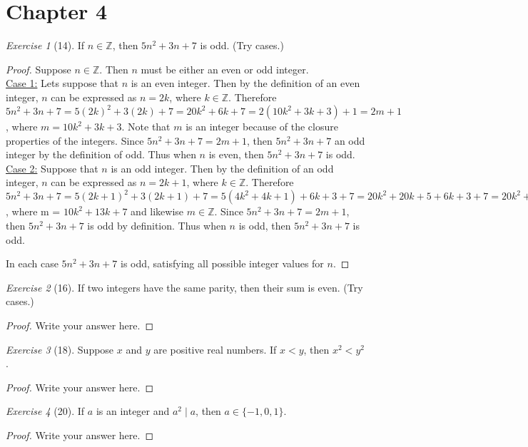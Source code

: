 \documentclass[12pt]{amsart}
\theoremstyle{remark}
\newtheorem*{exercise}{Exercise}%
\def\ZZ{\ensuremath{\mathbb Z}}
\theoremstyle{mycomment}
\begin{document}
\thispagestyle{fancy}
\section*{Chapter 4}
\begin{exercise}[14] If $n\in\ZZ$, then $5n^{2}+3n+7$ is odd. (Try cases.)
\begin{proof}
Suppose $n \in \ZZ$. Then $n$ must be either an even or odd integer. 
\\ \underline{Case 1:} Lets suppose that $n$ is an even integer. Then by the definition of an even integer, $n$ can be expressed as $n = 2k$, where $k \in \ZZ$. Therefore $5n^2 + 3n + 7 = 5(2k)^2 + 3(2k) + 7 = 20k^2 + 6k + 7 =2(10k^2 + 3k + 3) + 1 = 2m + 1$, where $m = 10k^2 + 3k + 3$. Note that $m$ is an integer because of the closure properties of the integers. Since $5n^{2}+3n+7 = 2m + 1$, then $5n^{2}+3n+7$ an odd integer by the definition of odd. Thus when $n$ is even, then $5n^{2}+3n+7$ is odd.
\\ \underline{Case 2:} Suppose that $n$ is an odd integer. Then by the definition of an odd integer, $n$ can be expressed as $n = 2k + 1$, where $k \in \ZZ$. Therefore $5n^2 + 3n + 7 = 5(2k+1)^2 + 3(2k+1) + 7 = 5(4k^2 +4k + 1)+ 6k+ 3 + 7 = 20k^2 + 20k + 5 + 6k + 3 + 7 = 20k^2 + 26k + 15 = 2(10k^2 + 13k + 7) + 1 = 2m + 1$, where m = $10k^2 + 13k +7$ and likewise $m \in \ZZ$. Since $5n^2 + 3n + 7 = 2m +1$, then $5n^2 + 3n + 7$ is odd by definition. Thus when $n$ is odd, then $5n^2 + 3n + 7$ is odd. 

In each case $5n^2 + 3n + 7$ is odd, satisfying all possible integer values for $n$.
\end{proof}
\end{exercise}

\begin{exercise}[16] If two integers have the same parity, then their sum is even. (Try cases.)
\begin{proof}
Write your answer here.
\end{proof}
\end{exercise}

\begin{exercise}[18] Suppose $x$ and $y$ are positive real numbers. If $x<y$, then $x^{2}<y^{2}$.
\begin{proof}
Write your answer here.
\end{proof}
\end{exercise}

\begin{exercise}[20] If $a$ is an integer and $a^{2}\mid a$, then $a\in\{-1,0,1\}$.
\begin{proof}
Write your answer here.
\end{proof}
\end{exercise}
\end{document}
